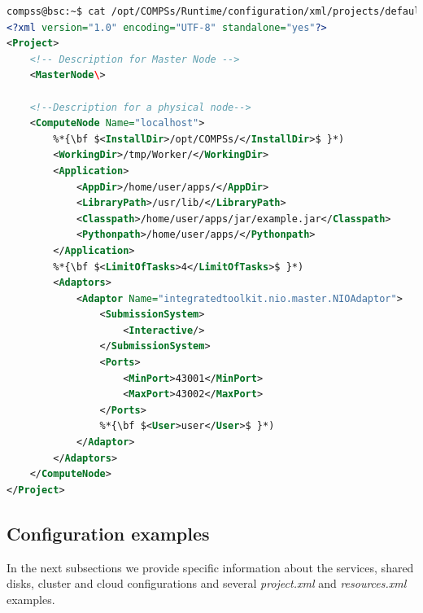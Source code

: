 \begin{lstlisting}[language=xml]
compss@bsc:~$ cat /opt/COMPSs/Runtime/configuration/xml/projects/default_project.xml
<?xml version="1.0" encoding="UTF-8" standalone="yes"?>
<Project>
    <!-- Description for Master Node --> 
    <MasterNode\>

    <!--Description for a physical node-->
    <ComputeNode Name="localhost">
        %*{\bf $<InstallDir>/opt/COMPSs/</InstallDir>$ }*)
        <WorkingDir>/tmp/Worker/</WorkingDir>
        <Application>
            <AppDir>/home/user/apps/</AppDir>
            <LibraryPath>/usr/lib/</LibraryPath>
            <Classpath>/home/user/apps/jar/example.jar</Classpath>
            <Pythonpath>/home/user/apps/</Pythonpath>
        </Application>
        %*{\bf $<LimitOfTasks>4</LimitOfTasks>$ }*)
        <Adaptors>
            <Adaptor Name="integratedtoolkit.nio.master.NIOAdaptor">
                <SubmissionSystem>
                    <Interactive/>
                </SubmissionSystem>
                <Ports>
                    <MinPort>43001</MinPort>
                    <MaxPort>43002</MaxPort>
                </Ports>
                %*{\bf $<User>user</User>$ }*)
            </Adaptor>
        </Adaptors>
    </ComputeNode>
</Project>
\end{lstlisting}
\label{lstlisting:project.xml}


\subsection{Configuration examples}
In the next subsections we provide specific information about the services, shared disks, cluster and cloud configurations and several \textit{project.xml} and \textit{resources.xml} examples. 


